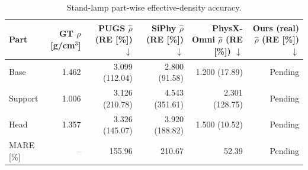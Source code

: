 \begin{table}[t]
\caption{Stand-lamp part-wise effective-density accuracy.}
\label{tab:density}
\centering
\scriptsize
\setlength{\tabcolsep}{8pt}
\begin{tabular}{lrrrrr}
\toprule
Part & \shortstack{GT $\rho$\\{}[g/cm$^3$]}
     & \shortstack{PUGS\\$\hat\rho$ (RE [\%]) $\downarrow$}
     & \shortstack{SiPhy\\$\hat\rho$ (RE [\%]) $\downarrow$}
     & \shortstack{PhysX-Omni\\$\hat\rho$ (RE [\%]) $\downarrow$}
     & \shortstack{Ours (real)\\$\hat\rho$ (RE [\%]) $\downarrow$} \\
\midrule
Base    & 1.462 & 3.099 (112.04) & 2.800 (91.58)  & 1.200 (17.89)  & Pending \\
Support & 1.006 & 3.126 (210.78) & 4.543 (351.61) & 2.301 (128.75) & Pending \\
Head    & 1.357 & 3.326 (145.07) & 3.920 (188.82) & 1.500 (10.52)  & Pending \\
\midrule
MARE [\%] & -- & 155.96 & 210.67 & 52.39 & Pending \\
\bottomrule
\end{tabular}
\end{table}

